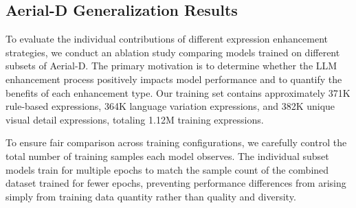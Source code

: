 \subsection{Aerial-D Generalization Results}
\label{subsec:ablation_studies}

To evaluate the individual contributions of different expression enhancement strategies, we conduct an ablation study comparing models trained on different subsets of Aerial-D. The primary motivation is to determine whether the LLM enhancement process positively impacts model performance and to quantify the benefits of each enhancement type. Our training set contains approximately 371K rule-based expressions, 364K language variation expressions, and 382K unique visual detail expressions, totaling 1.12M training expressions.

To ensure fair comparison across training configurations, we carefully control the total number of training samples each model observes. The individual subset models train for multiple epochs to match the sample count of the combined dataset trained for fewer epochs, preventing performance differences from arising simply from training data quantity rather than quality and diversity.

\begin{table}[t]
\centering
\caption{Aerial-D Generalization Results Across Four Datasets}
\label{tab:ablation_expression_types}
\end{table}

